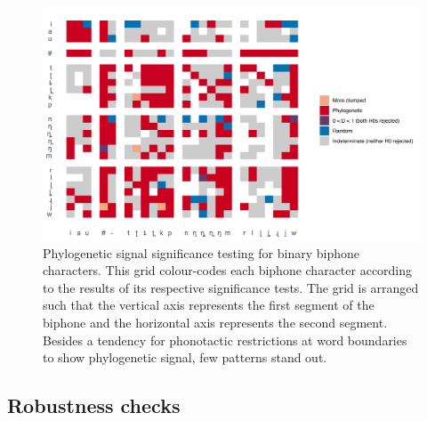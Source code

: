 \begin{figure}

{\centering \includegraphics[width=0.9\linewidth]{fig/d-sig-swatch} 

}

\caption{Phylogenetic signal significance testing for binary biphone characters. This grid colour-codes each biphone character according to the results of its respective significance tests. The grid is arranged such that the vertical axis represents the first segment of the biphone and the horizontal axis represents the second segment. Besides a tendency for phonotactic restrictions at word boundaries to show phylogenetic signal, few patterns stand out.}\label{fig:d-swatch}
\end{figure}

\hypertarget{phy-sig-bin-robustness}{%
\subsection{Robustness checks}\label{phy-sig-bin-robustness}}

